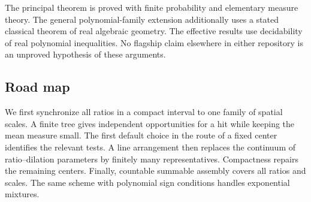 The principal theorem is proved with finite probability and elementary
measure theory. The general polynomial-family extension additionally uses
a stated classical theorem of real algebraic geometry. The effective
results use decidability of real polynomial inequalities. No flagship
claim elsewhere in either repository is an unproved hypothesis of these
arguments.

\subsection{Road map}

We first synchronize all ratios in a compact interval to one family of
spatial scales. A finite tree gives independent opportunities for a hit
while keeping the mean measure small. The first default choice in the
route of a fixed center identifies the relevant tests. A line arrangement
then replaces the continuum of ratio--dilation parameters by finitely many
representatives. Compactness repairs the remaining centers. Finally,
countable summable assembly covers all ratios and scales. The same scheme
with polynomial sign conditions handles exponential mixtures.

